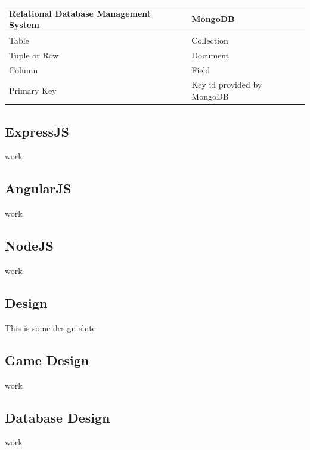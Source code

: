 \documentclass[12pt]{article}
\begin{document}
\begin{center}
    \begin{tabular}{| l | l |}
    \hline
    Relational Database Management System & MongoDB  \\ \hline
    Table & Collection \\ \hline
    Tuple or Row & Document \\ \hline
    Column & Field \\ \hline
    Primary Key & Key id provided by MongoDB \\ \hline
    \end{tabular}
\end{center}

\begin{center}
\subsection{ExpressJS}
work
\end{center}

\begin{center}
\subsection{AngularJS}
work
\end{center}

\begin{center}
\subsection{NodeJS}
work
\end{center}

\begin{center}
\section{Design}
This is some design shite
\end{center}

\begin{center}
\subsection{Game Design}
work
\end{center}

\begin{center}
\subsection{Database Design}
work
\end{center}
\end{document}
